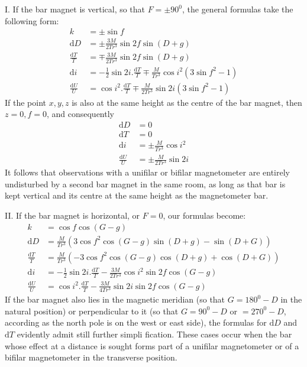 I. If the bar magnet is vertical, so that $F=\pm90^0$, the general formulas take the following form:
\[
\begin{aligned}
k&=\pm\sin f\\
\mathrm{d}D&=\pm\frac{3M}{2Tr^3}\sin2f\sin(D+g)\\
\frac{\mathrm{d}T}{T}&=\mp\frac{3M}{2Tr^3}\sin2f\sin(D+g)\\
\mathrm{d}i&=-\tfrac12\sin2i.\frac{\mathrm{d}T}{T}\mp\frac{M}{Tr^3}\cos i^2(3\sin f^2-1)\\
\frac{\mathrm{d}U}{U}&=\cos i^2.\frac{\mathrm{d}T}{T}\mp\frac{M}{2Tr^3}\sin2i(3\sin f^2-1)
\end{aligned}
\]
If the point $x,y,z$ is also at the same height as the centre of the bar magnet, then $z=0,f=0$, and consequently
\[
\begin{aligned}
\mathrm{d}D&=0\\
\mathrm{d}T&=0\\
\mathrm{d}i&=\pm\frac{M}{Tr^3}\cos i^2\\
\frac{\mathrm{d}U}{U}&=\pm\frac{M}{2Tr^3}\sin2i
\end{aligned}
\]
It follows that observations with a unifilar or bifilar magnetometer are entirely undisturbed by a second bar magnet in the same room, as long as that bar is kept vertical and its centre at the same height as the magnetometer bar.

II. If the bar magnet is horizontal, or $F=0$, our formulas become:
\[
\begin{aligned}
k&=\cos f\cos(G-g)\\
\mathrm{d}D&=\frac{M}{Tr^3}(3\cos f^2\cos(G-g)\sin(D+g)-\sin(D+G))\\
\frac{\mathrm{d}T}{T}&=\frac{M}{Tr^3}(-3\cos f^2\cos(G-g)\cos(D+g)+\cos(D+G))\\
\mathrm{d}i&=-\tfrac12\sin2i.\frac{\mathrm{d}T}{T}-\frac{3M}{2Tr^3}\cos i^2\sin2f\cos(G-g)\\
\frac{\mathrm{d}U}{U}&=\cos i^2.\frac{\mathrm{d}T}{T}-\frac{3M}{4Tr^3}\sin2i\sin2f\cos(G-g)
\end{aligned}
\]
If the bar magnet also lies in the magnetic meridian (so that $G=180^0-D$ in the natural position) or perpendicular to it (so that $G=90^0-D$ or $=270^0-D$, according as the north pole is on the west or east side), the formulas for $\mathrm{d}D$ and $\mathrm{d}T$ evidently admit still further simpli%
fication. These cases occur when the bar whose effect at a distance is sought forms part of a unifilar magnetometer or of a bifilar magnetometer in the transverse position.

